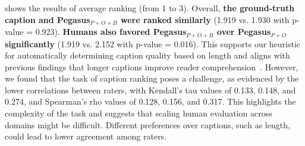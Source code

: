  shows the results of average ranking (from 1 to 3). 
Overall, \textbf{the ground-truth caption and Pegasus$_{P+O+B}$ were ranked similarly} (1.919 vs. 1.930 with p-value = 0.923). 
\textbf{Humans also favored Pegasus$_{P+O+B}$ over Pegasus$_{P+O}$ significantly} (1.919 vs. 2.152 with p-value = 0.016).
This supports our heuristic for automatically determining caption quality based on length 
and aligns with previous findings that longer captions improve reader comprehension~\cite{hartley2003single,gelman2002let}. 
However, we found that the task of caption ranking poses a challenge, as evidenced by the lower correlations between raters, with Kendall's tau values of 0.133, 0.148, and 0.274, and Spearman's rho values of 0.128, 0.156, and 0.317.
This highlights the complexity of the task and suggests that scaling human evaluation across domains might be difficult.
Different preferences over captions, such as length, could lead to lower agreement among raters.






